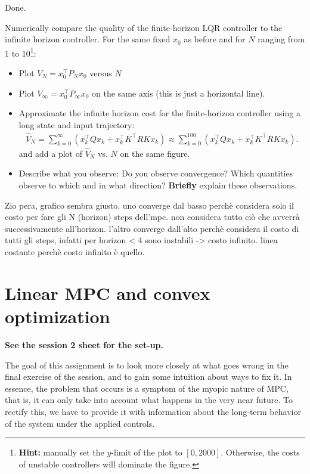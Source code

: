\documentclass[]{article}
\begin{document}
\begin{flushleft}
	Done.
\end{flushleft}



\begin{assignment}
	Numerically compare the quality of the finite-horizon LQR controller to the infinite horizon controller. 
	For the same fixed $x_0$ as before and for $N$ ranging from 1 to 10\footnote{\textbf{Hint:} manually set the $y$-limit of the plot to $[0, 2000]$. Otherwise, the costs of unstable controllers will dominate the figure.}: 
\begin{itemize}
	\item Plot $V_{N} = x_0^\top P_N x_0$ versus $N$
	\item Plot $V_{\infty} = x_0^\top P_{\infty} x_0$ on the same axis (this is just a horizontal line).
	\item Approximate the infinite horizon cost for the finite-horizon controller using a long state and input trajectory:
		\begin{align} \nonumber
			\hat{V}_{N} = \sum_{k=0}^\infty(x_k^\top Q x_k + x_k^\top K^\top R K x_k) \approx \sum_{k=0}^{100}(x_k^\top Q x_k + x_k^\top K^\top R K x_k). 
		\end{align}
	and add a plot of $\hat{V}_N$ vs. $N$ on the same figure.
	\item Describe what you observe: Do you observe convergence? Which quantities observe to which and in what direction? \textbf{Briefly} explain these observations.
\end{itemize}
\end{assignment}

\begin{flushleft}
Zio pera, grafico sembra giusto.  
uno converge dal basso perchè considera solo il costo per fare gli N (horizon) steps dell'mpc. non considera tutto ciò che avverrà successivamente all'horizon.
l'altro converge dall'alto perchè considera il costo di tutti gli steps, infatti per horizon < 4 sono instabili -> costo infinito.
linea costante perchè costo infinito è quello.
\end{flushleft}



\newpage
\section{Linear MPC and convex optimization}
\textbf{See the session 2 sheet for the set-up.}

The goal of this assignment is to look more closely at what goes wrong in the 
final exercise of the session, and to gain some intuition about ways to fix it.
In essence, the problem that occurs is a symptom of the myopic nature of MPC,
that is, it can only take into account what happens in the very near future.
To rectify this, we have to provide it with information about the long-term
behavior of the system under the applied controls.
\end{document}
